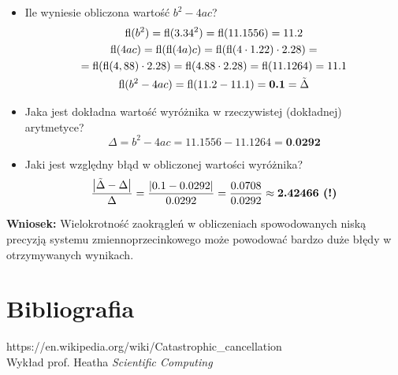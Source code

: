 \documentclass{article}
\DeclareMathOperator{\fl}{fl}
\begin{document}
\subsection{}
\begin{itemize}
    \item Ile wyniesie obliczona wartość \(b^2 - 4ac\)?
    \begin{gather*}
        \fl(b^2) = \fl(3.34^2) = \fl(11.1556) = 11.2\\
        \fl(4ac) = \fl(\fl(4a)c) = \fl(\fl(4 \cdot 1.22) \cdot 2.28) =\\
        = \fl(\fl(4,88) \cdot 2.28) = \fl(4.88 \cdot 2.28) = \fl(11.1264) = 11.1\\
        \fl(b^2 - 4ac) = \fl(11.2 - 11.1) = \textbf{0.1} = \Tilde{\Delta}
    \end{gather*}
    \item Jaka jest dokładna wartość wyróżnika w rzeczywistej (dokładnej) arytmetyce?
    \[\Delta = b^2 - 4ac = 11.1556 - 11.1264 = \textbf{0.0292}\]
    \item Jaki jest względny błąd w obliczonej wartości wyróżnika?
    \[\frac{\left|\Tilde{\Delta} - \Delta\right|}{\Delta} = \frac{|0.1 - 0.0292|}{0.0292} = \frac{0.0708}{0.0292} \approx \textbf{2.42466 (!)}\]
\end{itemize}
\textbf{Wniosek:} Wielokrotność zaokrągleń w obliczeniach spowodowanych niską precyzją systemu zmiennoprzecinkowego może powodować bardzo duże błędy w otrzymywanych wynikach.

\section{Bibliografia}
https://en.wikipedia.org/wiki/Catastrophic\_cancellation\\
Wykład prof. Heatha \textit{Scientific Computing}
\end{document}
